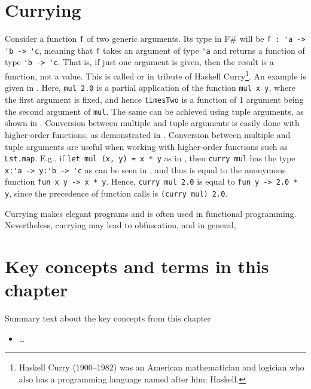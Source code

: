 \documentclass[fsharpNotes.tex]{subfiles}
\begin{document}
\section{Currying}
Consider a function \lstinline{f} of two generic arguments. Its type in F\# will be \lstinline{f : 'a -> 'b -> 'c}, meaning that \lstinline{f} takes an argument of type \lstinline{'a} and returns a function of type \lstinline{'b -> 'c}. That is, if just one argument is given, then the result is a function, not a value. This is called  or  in tribute of Haskell Curry\footnote{Haskell Curry (1900--1982) was an American mathematician and logician who also has a programming language named after him: Haskell.}. An example is given in .
%
%
Here, \lstinline{mul 2.0} is a partial application of the function \lstinline{mul x y}, where the first argument is fixed, and hence \lstinline{timesTwo} is a function of 1 argument being the second argument of \lstinline{mul}. The same can be achieved using tuple arguments, as shown in .
%
%
Conversion between multiple and tuple arguments is easily done with higher-order functions, as demonstrated in .
%
%
Conversion between multiple and tuple arguments are useful when working with higher-order functions such as \lstinline{Lst.map}. E.g., if \lstinline{let mul (x, y) = x * y} as in , then \lstinline{curry mul} has the type \lstinline{x:'a -> y:'b -> 'c} as can be seen in , and thus is equal to the anonymous function \lstinline{fun x y -> x * y}. Hence, \lstinline{curry mul 2.0} is equal to \lstinline{fun y -> 2.0 * y}, since the precedence of function calls is \lstinline{(curry mul) 2.0}. 

Currying makes elegant programs and is often used in functional programming. Nevertheless, currying may lead to obfuscation, and in general, 

\section{Key concepts and terms in this chapter}
Summary text about the key concepts from this chapter
\begin{itemize}
\item \ldots
\end{itemize}
\end{document}
